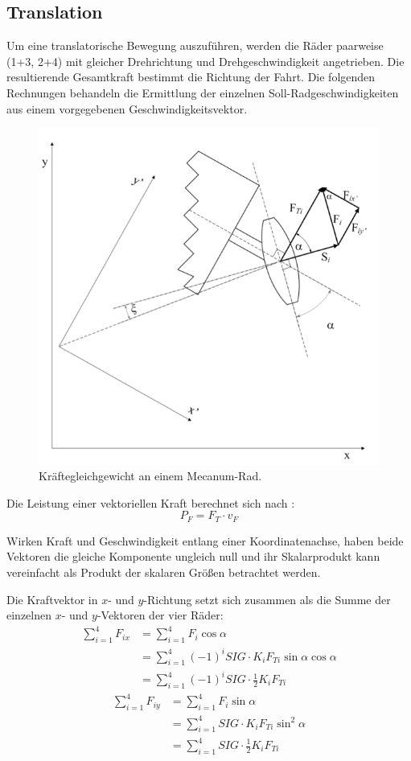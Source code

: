 \subsection{Translation}
\label{sec:Translation}
Um eine translatorische Bewegung auszuführen, werden die Räder paarweise (1+3, 2+4) mit gleicher Drehrichtung und Drehgeschwindigkeit angetrieben.
Die resultierende Gesamtkraft bestimmt die Richtung der Fahrt.
Die folgenden Rechnungen behandeln die Ermittlung der einzelnen Soll-Radgeschwindigkeiten aus einem vorgegebenen Geschwindigkeitsvektor.

\begin{figure}[H]
    \centering
    \includegraphics[width=.6\textwidth]{Abbildungen/Kraefte-am-Rad}
    \caption{Kräftegleichgewicht an einem Mecanum-Rad.}
\end{figure}

Die Leistung einer vektoriellen Kraft berechnet sich nach : 
$$ P_F = F_T \cdot v_F $$

Wirken Kraft und Geschwindigkeit entlang einer Koordinatenachse, haben beide Vektoren die gleiche Komponente ungleich null und ihr Skalarprodukt kann vereinfacht als Produkt der skalaren Größen betrachtet werden.

Die Kraftvektor in $x$- und $y$-Richtung setzt sich zusammen als die Summe der einzelnen $x$- und $y$-Vektoren der vier Räder:
\begin{align*}
    \sum_{i=1}^4 F_{ix} &= \sum_{i=1}^4 F_i \cos \alpha \\
    &= \sum_{i=1}^4 (-1)^i SIG \cdot K_i F_{Ti} \sin \alpha \cos \alpha \\
    &= \sum_{i=1}^4 (-1)^i SIG \cdot \frac{1}{2} K_i F_{Ti}
\end{align*}
\begin{align*}
    \sum_{i=1}^4 F_{iy} &= \sum_{i=1}^4 F_i \sin \alpha \\
    &= \sum_{i=1}^4 SIG \cdot K_i F_{Ti} \sin^2 \alpha \\
    &= \sum_{i=1}^4 SIG \cdot \frac{1}{2} K_i F_{Ti}
\end{align*}

